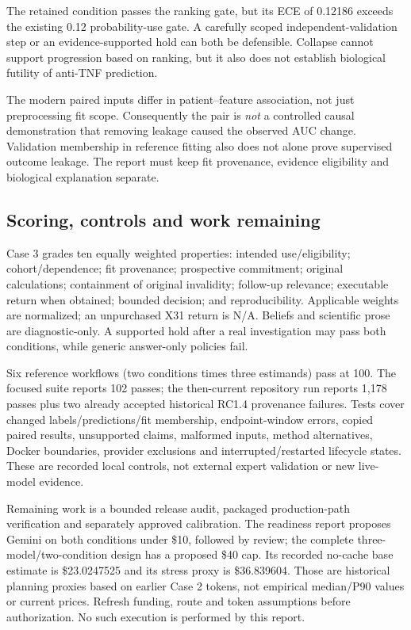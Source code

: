 \documentclass[11pt,a4paper]{article}
\begin{document}
The retained condition passes the ranking gate, but its ECE of 0.12186 exceeds the existing 0.12 probability-use gate. A carefully scoped independent-validation step or an evidence-supported hold can both be defensible. Collapse cannot support progression based on ranking, but it also does not establish biological futility of anti-TNF prediction.

The modern paired inputs differ in patient--feature association, not just preprocessing fit scope. Consequently the pair is \emph{not} a controlled causal demonstration that removing leakage caused the observed AUC change. Validation membership in reference fitting also does not alone prove supervised outcome leakage. The report must keep fit provenance, evidence eligibility and biological explanation separate.

\subsection{Scoring, controls and work remaining}

Case 3 grades ten equally weighted properties: intended use/eligibility; cohort/dependence; fit provenance; prospective commitment; original calculations; containment of original invalidity; follow-up relevance; executable return when obtained; bounded decision; and reproducibility. Applicable weights are normalized; an unpurchased X31 return is N/A. Beliefs and scientific prose are diagnostic-only. A supported hold after a real investigation may pass both conditions, while generic answer-only policies fail.

Six reference workflows (two conditions times three estimands) pass at 100. The focused suite reports 102 passes; the then-current repository run reports 1,178 passes plus two already accepted historical RC1.4 provenance failures. Tests cover changed labels/predictions/fit membership, endpoint-window errors, copied paired results, unsupported claims, malformed inputs, method alternatives, Docker boundaries, provider exclusions and interrupted/restarted lifecycle states. These are recorded local controls, not external expert validation or new live-model evidence.

Remaining work is a bounded release audit, packaged production-path verification and separately approved calibration. The readiness report proposes Gemini on both conditions under \$10, followed by review; the complete three-model/two-condition design has a proposed \$40 cap. Its recorded no-cache base estimate is \$23.0247525 and its stress proxy is \$36.839604. Those are historical planning proxies based on earlier Case 2 tokens, not empirical median/P90 values or current prices. Refresh funding, route and token assumptions before authorization. No such execution is performed by this report.
\end{document}
